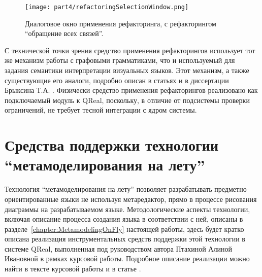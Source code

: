 \begin{figure} [ht]
	\begin{center}
		\texttt{[image: part4/refactoringSelectionWindow.png]}
		\caption{Диалоговое окно применения рефакторинга, с рефакторингом "`обращение всех связей"'.}
		\label{image:refactoringSelectionWindow}
	\end{center}
\end{figure}

С технической точки зрения средство применения рефакторингов использует тот же механизм 
работы с графовыми грамматиками, что и используемый для задания семантики интерпретации 
визуальных языков. Этот механизм, а также существующие его аналоги, подробно описан в статьях
 и в диссертации Брыксина Т.А.
. Физически средство применения рефакторингов реализовано как подключаемый модуль к 
QReal, поскольку, в отличие от подсистемы проверки ограничений, не требует тесной 
интеграции с ядром системы.

\section{Средства поддержки технологии "`метамоделирования на лету"'}
Технология "`метамоделирования на лету"' позволяет разрабатывать предметно-ориентированные 
языки не используя метаредактор, прямо в процессе рисования диаграммы на разрабатываемом 
языке. Методологические аспекты технологии, включая описание процесса создания языка 
в соответствии с ней, описаны в разделе~\ref{chapter:MetamodelingOnFly} настоящей 
работы, здесь будет кратко описана реализация инструментальных средств поддержки этой 
технологии в системе QReal, выполненная под руководством автора Птахиной Алиной Ивановной 
в рамках курсовой работы. Подробное описание реализации можно найти в тексте курсовой работы 
и в статье
.


